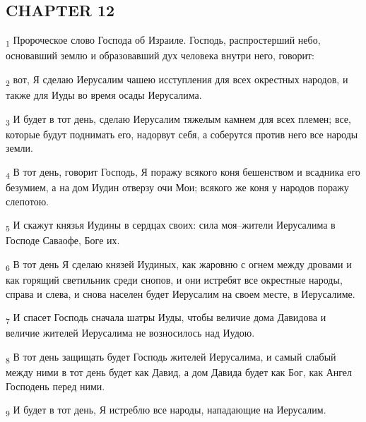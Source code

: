 \subsection{CHAPTER 12}
\begin{tcolorbox}
\textsubscript{1} Пророческое слово Господа об Израиле. Господь, распростерший небо, основавший землю и образовавший дух человека внутри него, говорит:
\end{tcolorbox}
\begin{tcolorbox}
\textsubscript{2} вот, Я сделаю Иерусалим чашею исступления для всех окрестных народов, и также для Иуды во время осады Иерусалима.
\end{tcolorbox}
\begin{tcolorbox}
\textsubscript{3} И будет в тот день, сделаю Иерусалим тяжелым камнем для всех племен; все, которые будут поднимать его, надорвут себя, а соберутся против него все народы земли.
\end{tcolorbox}
\begin{tcolorbox}
\textsubscript{4} В тот день, говорит Господь, Я поражу всякого коня бешенством и всадника его безумием, а на дом Иудин отверзу очи Мои; всякого же коня у народов поражу слепотою.
\end{tcolorbox}
\begin{tcolorbox}
\textsubscript{5} И скажут князья Иудины в сердцах своих: сила моя--жители Иерусалима в Господе Саваофе, Боге их.
\end{tcolorbox}
\begin{tcolorbox}
\textsubscript{6} В тот день Я сделаю князей Иудиных, как жаровню с огнем между дровами и как горящий светильник среди снопов, и они истребят все окрестные народы, справа и слева, и снова населен будет Иерусалим на своем месте, в Иерусалиме.
\end{tcolorbox}
\begin{tcolorbox}
\textsubscript{7} И спасет Господь сначала шатры Иуды, чтобы величие дома Давидова и величие жителей Иерусалима не возносилось над Иудою.
\end{tcolorbox}
\begin{tcolorbox}
\textsubscript{8} В тот день защищать будет Господь жителей Иерусалима, и самый слабый между ними в тот день будет как Давид, а дом Давида будет как Бог, как Ангел Господень перед ними.
\end{tcolorbox}
\begin{tcolorbox}
\textsubscript{9} И будет в тот день, Я истреблю все народы, нападающие на Иерусалим.
\end{tcolorbox}
